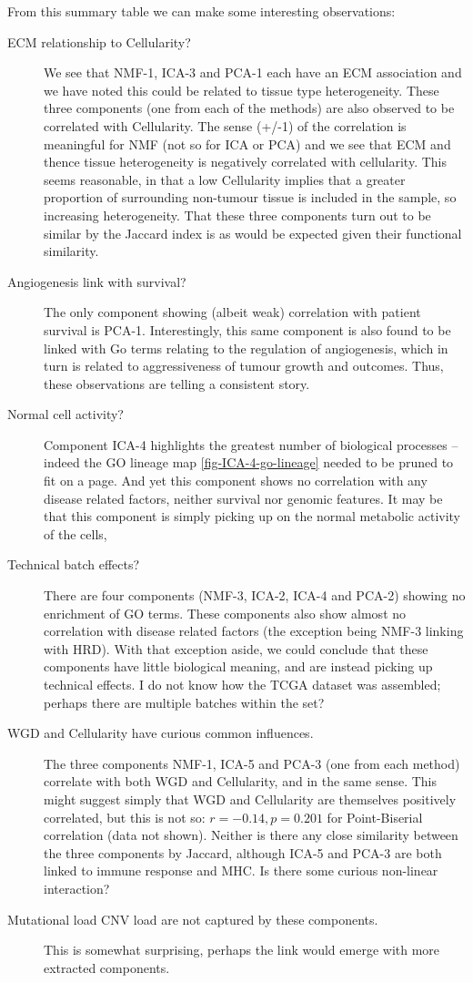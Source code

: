 \documentclass[draft,tikz, 12pt,a4paper,oneside,fleqn]{article}
\begin{document}
From this summary table we can make some interesting observations:
\begin{description}
\item[ECM relationship to Cellularity?]
We see that NMF-1, ICA-3 and PCA-1 each have an ECM association and we have noted this could be related to tissue type heterogeneity.   These three components (one from each of the methods) are also observed to be correlated with Cellularity.  The sense (+/-1) of the correlation is meaningful for NMF (not so for ICA or PCA) and we see that ECM and thence tissue heterogeneity is negatively correlated with cellularity. This seems reasonable, in that a low Cellularity implies that a greater proportion of surrounding non-tumour tissue is included in the sample, so increasing heterogeneity.   That these three components turn out to be similar by the Jaccard index is as would be expected given their functional similarity.
\item[Angiogenesis link with survival?]
The only component showing (albeit weak) correlation with patient survival is PCA-1.  Interestingly, this same component is also found to be linked with Go terms relating to the regulation of angiogenesis, which in turn is related to aggressiveness of tumour growth and outcomes.  Thus, these observations are telling a consistent story.
\item[Normal cell activity?]
Component ICA-4 highlights the greatest number of biological processes -- indeed the GO lineage map \ref{fig-ICA-4-go-lineage} needed to be pruned to fit on a page.  And yet this component shows no correlation with any disease related factors, neither survival nor genomic features.  It may be that this component is simply picking up on the normal metabolic activity of the cells,
\item[Technical batch effects?]
There are four components (NMF-3, ICA-2, ICA-4 and PCA-2) showing no enrichment of GO terms.  These components also show almost no correlation with disease related factors (the exception being NMF-3 linking with HRD).  With that exception aside, we could conclude that these components have little biological meaning, and are instead picking up technical effects.  I do not know how the TCGA dataset was assembled; perhaps there are multiple batches within the set?
\item[WGD and Cellularity have curious common influences.]
The three components NMF-1, ICA-5 and PCA-3 (one from each method) correlate with both WGD and Cellularity, and in the same sense. 
This might suggest simply that WGD and Cellularity are themselves positively correlated, but this is not so: $r=-0.14, p=0.201$ for Point-Biserial correlation (data not shown).  Neither is there any close similarity between the three components by Jaccard, although ICA-5 and PCA-3 are both linked to immune response and MHC.   Is there some curious non-linear interaction?
\item[Mutational load CNV load are not captured by these components.]  This is somewhat surprising, perhaps the link would emerge with more extracted components.
\end{description} 
\end{document}
